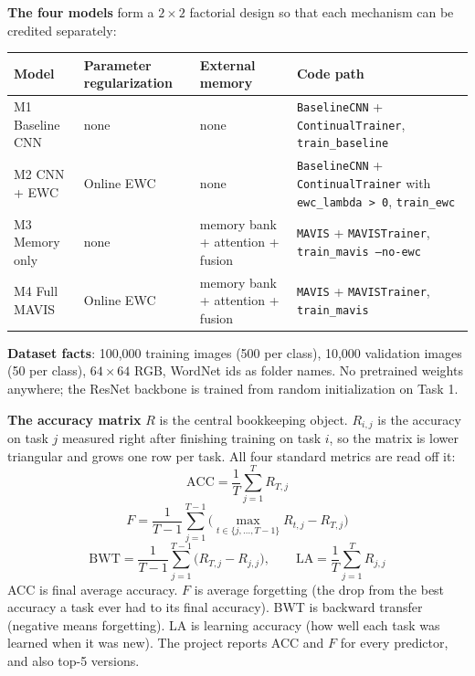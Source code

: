 \documentclass[11pt,a4paper]{article}
\newcommand{\code}[1]{\texttt{#1}}
\begin{document}
\textbf{The four models} form a $2 \times 2$ factorial design so that each mechanism can be credited separately:

\begin{tabularx}{\textwidth}{L{3cm} L{3cm} L{3.4cm} Y}
\toprule
Model & Parameter regularization & External memory & Code path \\
\midrule
M1 Baseline CNN & none & none & \code{BaselineCNN} + \code{ContinualTrainer}, \code{train\_baseline} \\
M2 CNN + EWC & Online EWC & none & \code{BaselineCNN} + \code{ContinualTrainer} with \code{ewc\_lambda > 0}, \code{train\_ewc} \\
M3 Memory only & none & memory bank + attention + fusion & \code{MAVIS} + \code{MAVISTrainer}, \code{train\_mavis --no-ewc} \\
M4 Full MAVIS & Online EWC & memory bank + attention + fusion & \code{MAVIS} + \code{MAVISTrainer}, \code{train\_mavis} \\
\bottomrule
\end{tabularx}

\textbf{Dataset facts}: 100{,}000 training images (500 per class), 10{,}000 validation images (50 per class), $64 \times 64$ RGB, WordNet ids as folder names. No pretrained weights anywhere; the ResNet backbone is trained from random initialization on Task 1.

\textbf{The accuracy matrix} $R$ is the central bookkeeping object. $R_{i,j}$ is the accuracy on task $j$ measured right after finishing training on task $i$, so the matrix is lower triangular and grows one row per task. All four standard metrics are read off it:
\begin{equation}
\mathrm{ACC} = \frac{1}{T}\sum_{j=1}^{T} R_{T,j}
\end{equation}
\begin{equation}
F = \frac{1}{T-1}\sum_{j=1}^{T-1}\Big(\max_{t \in \{j,\dots,T-1\}} R_{t,j} - R_{T,j}\Big)
\end{equation}
\begin{equation}
\mathrm{BWT} = \frac{1}{T-1}\sum_{j=1}^{T-1}\big(R_{T,j} - R_{j,j}\big), \qquad \mathrm{LA} = \frac{1}{T}\sum_{j=1}^{T} R_{j,j}
\end{equation}
ACC is final average accuracy. $F$ is average forgetting (the drop from the best accuracy a task ever had to its final accuracy). BWT is backward transfer (negative means forgetting). LA is learning accuracy (how well each task was learned when it was new). The project reports ACC and $F$ for every predictor, and also top-5 versions.
\end{document}
